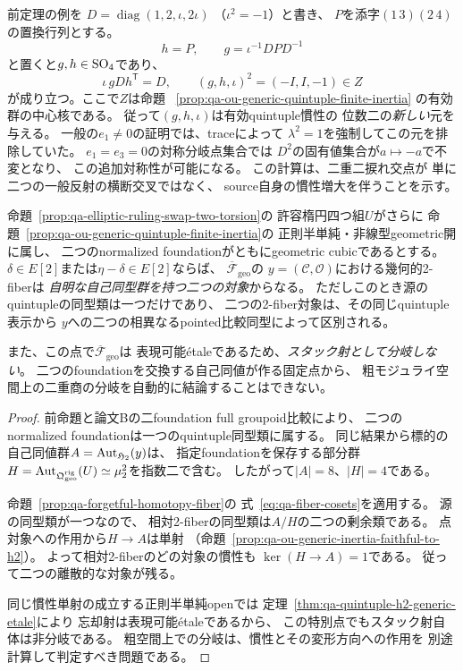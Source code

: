 \begin{remark}[trace零交点で現れる追加のOU直交対称性]
\label{rem:qa-ou-trace-zero-extra-stabilizer}
前定理の例を
$D=\operatorname{diag}(1,2,\iota,2\iota)$
（$\iota^2=-1$）と書き、
$P$を添字$(1\,3)(2\,4)$の置換行列とする。
\[
 h=P,\qquad g=\iota^{-1}DPD^{-1}
\]
と置くと$g,h\in\operatorname{SO}_4$であり、
\[
 \iota\,gDh^{\mathsf T}=D,\qquad
 (g,h,\iota)^2=(-I,I,-1)\in Z
\]
が成り立つ。ここで$Z$は命題
~\ref{prop:qa-ou-generic-quintuple-finite-inertia}
の有効群の中心核である。
従って$(g,h,\iota)$は有効quintuple慣性の
位数二の\emph{新しい}元を与える。
一般の$e_1\ne0$の証明では、traceによって
$\lambda^2=1$を強制してこの元を排除していた。
$e_1=e_3=0$の対称分岐点集合では
$D^2$の固有値集合が$a\mapsto-a$で不変となり、
この追加対称性が可能になる。
この計算は、二重二捩れ交点が
単に二つの一般反射の横断交叉ではなく、
source自身の慣性増大を伴うことを示す。
\end{remark}

\begin{proposition}
\label{prop:qa-special-ruling-two-fiber-no-stack-ramification}
命題~\ref{prop:qa-elliptic-ruling-swap-two-torsion}の
許容楕円四つ組$U$がさらに
命題~\ref{prop:qa-ou-generic-quintuple-finite-inertia}の
正則半単純・非線型geometric開に属し、
二つのnormalized foundationがともにgeometric cubicであるとする。
$\delta\in E[2]$または$\eta-\delta\in E[2]$ならば、
$\overline{\mathcal F}_{\mathrm{geo}}$の
$y=(\mathcal C,\mathcal O)$における幾何的2-fiberは
\emph{自明な自己同型群を持つ二つの対象}からなる。
ただしこのとき源のquintupleの同型類は一つだけであり、
二つの2-fiber対象は、その同じquintuple表示から
$y$への二つの相異なるpointed比較同型によって区別される。

また、この点で$\overline{\mathcal F}_{\mathrm{geo}}$は
表現可能étaleであるため、\emph{スタック射として分岐しない}。
二つのfoundationを交換する自己同値が作る固定点から、
粗モジュライ空間上の二重商の分岐を自動的に結論することはできない。
\end{proposition}
\begin{proof}
前命題と論文Bの二foundation full groupoid比較により、
二つのnormalized foundationは一つのquintuple同型類に属する。
同じ結果から標的の自己同値群$A=\operatorname{Aut}_{\mathfrak H_2}(y)$は、
指定foundationを保存する部分群
$H=\operatorname{Aut}_{\mathfrak Q_{\mathrm{geo}}^{\mathrm{rig}}}(U)
\simeq\mu_2^2$を指数二で含む。
したがって$|A|=8$、$|H|=4$である。

命題~\ref{prop:qa-forgetful-homotopy-fiber}の
式~\eqref{eq:qa-fiber-cosets}を適用する。
源の同型類が一つなので、
相対2-fiberの同型類は$A/H$の二つの剰余類である。
点対象への作用から$H\to A$は単射
（命題~\ref{prop:qa-ou-generic-inertia-faithful-to-h2}）。
よって相対2-fiberのどの対象の慣性も
$\ker(H\to A)=1$である。
従って二つの離散的な対象が残る。

同じ慣性単射の成立する正則半単純openでは
定理~\ref{thm:qa-quintuple-h2-generic-etale}により
忘却射は表現可能étaleであるから、
この特別点でもスタック射自体は非分岐である。
粗空間上での分岐は、慣性とその変形方向への作用を
別途計算して判定すべき問題である。
\end{proof}

